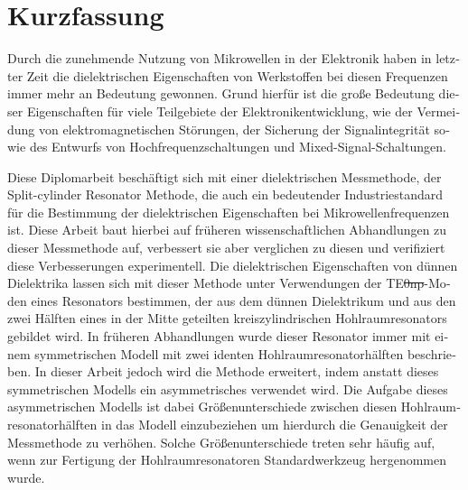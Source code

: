 \chapter*{Kurzfassung}
\begin{otherlanguage}{german}
Durch die zunehmende Nutzung von Mikrowellen in der Elektronik haben in letzter Zeit die dielektrischen Eigenschaften von Werkstoffen bei diesen Frequenzen immer mehr an Bedeutung gewonnen. Grund hierfür ist die große Bedeutung dieser Eigenschaften für viele Teilgebiete der Elektronik\-entwicklung, wie der Vermeidung von elektromagnetischen Störungen, der Sicherung der Signal\-integrität sowie des Entwurfs von Hoch\-fre\-quenz\-schalt\-ungen und Mixed-\-Signal-\-Schaltungen.

Diese Diplomarbeit beschäftigt sich mit einer dielektrischen Messmethode, der Split-\-cylinder Resonator Methode, die auch ein bedeutender Industriestandard für die Bestimmung der dielektrischen Eigenschaften bei Mikrowellenfrequenzen ist. Diese Arbeit baut hierbei auf früheren wissenschaftlichen Abhandlungen zu dieser Messmethode auf, verbessert sie aber verglichen zu diesen und verifiziert diese Verbesserungen experimentell. Die dielektrischen Eigenschaften von dünnen Dielektrika lassen sich mit dieser Methode unter Verwendungen der TE\st{0np}-Moden eines Resonators bestimmen, der aus dem dünnen Dielektrikum und aus den zwei Hälften eines in der Mitte geteilten kreiszylindrischen Hohlraumresonators gebildet wird. In früheren Abhandlungen wurde dieser Resonator immer mit einem symmetrischen Modell mit zwei identen Hohl\-raum\-resonator\-hälften beschrieben. In dieser Arbeit jedoch wird die Methode erweitert, indem anstatt dieses symmetrischen Modells ein asymmetrisches verwendet wird. Die Aufgabe dieses asymmetrischen Modells ist dabei Größen\-unterschiede zwischen diesen Hohl\-raum\-resonator\-hälften in das Modell einzubeziehen um hierdurch die Genauigkeit der Messmethode zu verhöhen. Solche Größen\-unterschiede treten sehr häufig auf, wenn zur Fertigung der Hohlraum\-resonatoren Standardwerkzeug hergenommen wurde.


\end{otherlanguage}
